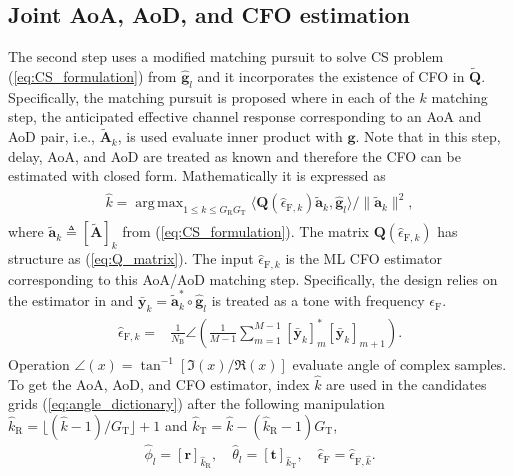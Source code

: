 \documentclass[journal]{IEEEtran}
\DeclareMathOperator*{\argmax}{arg\,max} %
\newcommand{\tx}[0]{\text{T}}
\newcommand{\rx}[0]{\text{R}}
\newcommand{\transpose}[0]{\text{T}}
\newcommand{\CFO}[0]{\epsilon_{\text{F}}}
\newcommand{\Gt}[0]{G_{\text{T}}}
\begin{document}
\subsection{Joint AoA, AoD, and CFO estimation}

The second step uses a modified matching pursuit to solve CS problem (\ref{eq:CS_formulation}) from $\hat{\mathbf{g}}_l$ and it incorporates the existence of CFO in $\tilde{\mathbf{Q}}$. Specifically, the matching pursuit is proposed where in each of the $k$ matching step, the anticipated effective channel response corresponding to an AoA and AoD pair, i.e., $\tilde{\mathbf{A}}_k$, is used evaluate inner product with $\mathbf{g}$. Note that in this step, delay, AoA, and AoD are treated as known and therefore the CFO can be estimated with closed form. Mathematically it is expressed as
\begin{align}
\begin{split}
\hat{k} = \argmax_{1\leq k \leq G_{\text{R}}G_{\text{T}}}\langle \mathbf{Q}(\hat{\epsilon}_{\text{F},k})\tilde{\mathbf{a}}_k,\hat{\mathbf{g}}_l\rangle /\|\tilde{\mathbf{a}}_k\|^2,
\end{split}
\label{eq:AoA_AoD_est_start}
\end{align}
where $\tilde{\mathbf{a}}_k \triangleq [\tilde{\mathbf{A}}]_k$ from (\ref{eq:CS_formulation}). The matrix $\mathbf{Q}(\hat{\epsilon}_{\text{F},k})$ has structure as (\ref{eq:Q_matrix}). The input $\hat{\epsilon}_{\text{F},k}$ is the ML CFO estimator corresponding to this AoA/AoD matching step. Specifically, the design relies on the estimator in \cite{Kay_single_tone} and $\bar{\mathbf{y}}_{k} = \tilde{\mathbf{a}}^{*}_k \circ \hat{\mathbf{g}}_l$ is treated as a tone with frequency $\CFO$. 
\begin{align}
\begin{split}
\hat{\epsilon}_{\text{F},k} = &\frac{1}{N_{\text{B}}}\angle\left(\frac{1}{M-1}\sum_{m=1}^{M-1}\left[\bar{\mathbf{y}}_k\right]^{*}_{m}\left[\bar{\mathbf{y}}_k\right]_{m+1}\right).
\end{split}
\label{eq:CFO_est}
\end{align}
Operation $\angle(x) = \tan^{-1}[\Im(x)/\Re(x)]$ evaluate angle of complex samples. 
To get the AoA, AoD, and CFO estimator, index $\hat{k}$ are used in the candidates grids (\ref{eq:angle_dictionary}) after the following manipulation $\hat{k}_{\rx} = \lfloor (\hat{k}-1)/\Gt \rfloor+1$ and $\hat{k}_{\tx} = \hat{k} - (\hat{k}_{\rx}-1)\Gt$,
\begin{align}
\hat{\phi}_l = [\mathbf{r}]_{\hat{k}_{\rx}}, \quad \hat{\theta}_l = [\mathbf{t}]_{\hat{k}_{\tx}},\quad \hat{\epsilon}_{\text{F}} = \hat{\epsilon}_{\text{F},\hat{k}}.
\label{eq:get_est_from_dictionary}
\end{align}
\end{document}
